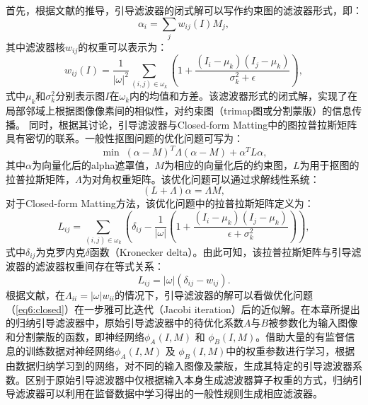 首先，根据文献\parencite{he2010guided}的推导，引导滤波器的闭式解可以写作约束图的滤波器形式，即：
\begin{equation}
	\alpha_i = \sum_j w_{ij}(I)M_j,
\end{equation}
其中滤波器核$w_{ij}$的权重可以表示为：
\begin{equation}
	w_{ij}(I) = \frac{1}{|\omega|^2} \sum_{(i,j)\in \omega_k}(1+\frac{(I_i-\mu_k)(I_j-\mu_k)}{\sigma^2_k+\epsilon}),
\end{equation}
式中$\mu_k$和$\sigma^2_k$分别表示图$I$在$\omega_k$内的均值和方差。该滤波器形式的闭式解，实现了在局部邻域上根据图像像素间的相似性，对约束图（trimap图或分割蒙版）的信息传播。
同时，根据其讨论，引导滤波器与Closed-form Matting\cite{levin2008closed}中的图拉普拉斯矩阵具有密切的联系。一般性抠图问题的优化问题可写为：
\begin{equation}
	\mathop{\mathrm{min}}\; (\alpha-M)^T\Lambda(\alpha-M)+\alpha^T L\alpha,
	\label{eq6:closed}
\end{equation}
其中$\alpha$为向量化后的alpha遮罩值，$M$为相应的向量化后的约束图，$L$为用于抠图的拉普拉斯矩阵，$\Lambda$为对角权重矩阵。该优化问题可以通过求解线性系统：
\begin{equation}
	(L+\Lambda)\alpha=\Lambda M,
\end{equation}
对于Closed-form Matting方法，该优化问题中的拉普拉斯矩阵定义为：
\begin{equation}
	L_{ij} = \sum_{(i,j)\in \omega_k}(\delta_{ij}-\frac{1}{|\omega|} (1+\frac{(I_i-\mu_k)(I_j-\mu_k)}{\epsilon+\sigma^2_k})),
\end{equation}
式中$\delta_{ij}$为克罗内克$\delta$函数（Kronecker delta）。由此可知，该拉普拉斯矩阵与引导滤波器的滤波器权重间存在等式关系：
\begin{equation}
	L_{ij}=|\omega|(\delta_{ij}-w_{ij}).
\end{equation}
根据文献\parencite{he2010guided}，在$\Lambda_{ii}=|\omega|w_{ii}$的情况下，引导滤波器的解可以看做优化问题（\ref{eq6:closed}）在一步雅可比迭代（Jacobi iteration）后的近似解。在本章所提出的归纳引导滤波器中，原始引导滤波器中的待优化系数$A$与$B$被参数化为输入图像和分割蒙版的函数，即神经网络$ \phi_{A}(I, M) $ 和 $ \phi_{B}(I, M) $。借助大量的有监督信息的训练数据对神经网络$ \phi_{A}(I, M) $ 及 $ \phi_{B}(I, M) $中的权重参数进行学习，根据由数据归纳学习到的网络，对不同的输入图像及蒙版，生成其特定的引导滤波器系数。区别于原始引导滤波器中仅根据输入本身生成滤波器算子权重的方式，归纳引导滤波器可以利用在监督数据中学习得出的一般性规则生成相应滤波器。

